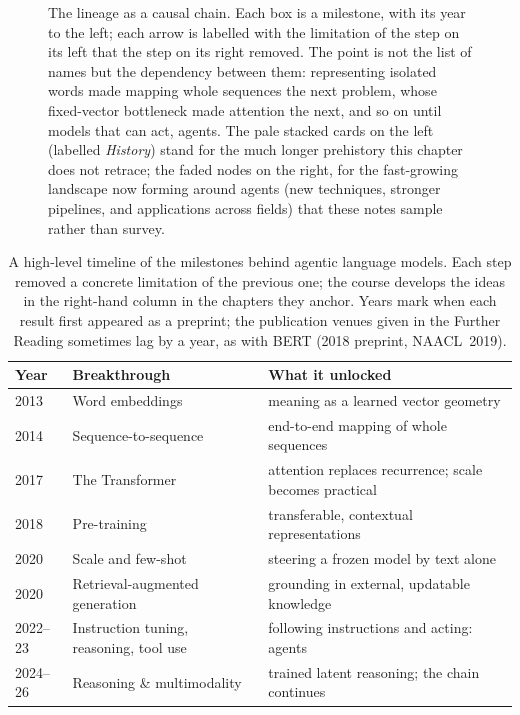 \begin{figure}[t]
\centering

\caption{The lineage as a causal chain.
Each box is a milestone, with its year to the left; each arrow is labelled with the limitation of the step on its left that the step on its right removed.
The point is not the list of names but the dependency between them: representing isolated words made mapping whole sequences the next problem, whose fixed-vector bottleneck made attention the next, and so on until models that can act, agents.
The pale stacked cards on the left (labelled \emph{History}) stand for the much longer prehistory this chapter does not retrace; the faded nodes on the right, for the fast-growing landscape now forming around agents (new techniques, stronger pipelines, and applications across fields) that these notes sample rather than survey.}
\label{figure:AgenticChain}
\end{figure}

\begin{table}[t]
\centering
\setlength{\belowcaptionskip}{8pt}
\caption{A high-level timeline of the milestones behind agentic language models.
Each step removed a concrete limitation of the previous one; the course develops the ideas in the right-hand column in the chapters they anchor.
Years mark when each result first appeared as a preprint; the publication venues given in the Further Reading sometimes lag by a year, as with BERT (2018 preprint, NAACL~2019).}
\label{table:AgenticTimeline}
\small
\begin{tabular}{@{}l l p{6.8cm}@{}}
\toprule
Year & Breakthrough & \raggedright What it unlocked \tabularnewline
\midrule
2013  & Word embeddings                   & \raggedright meaning as a learned vector geometry \tabularnewline
2014  & Sequence-to-sequence              & \raggedright end-to-end mapping of whole sequences \tabularnewline
2017  & The Transformer                   & \raggedright attention replaces recurrence; scale becomes practical \tabularnewline
2018  & Pre-training                      & \raggedright transferable, contextual representations \tabularnewline
2020  & Scale and few-shot                & \raggedright steering a frozen model by text alone \tabularnewline
2020  & Retrieval-augmented generation    & \raggedright grounding in external, updatable knowledge \tabularnewline
2022--23 & Instruction tuning, reasoning, tool use & \raggedright following instructions and acting: agents \tabularnewline
2024--26 & Reasoning \& multimodality     & \raggedright trained latent reasoning; the chain continues \tabularnewline
\bottomrule
\end{tabular}
\end{table}

